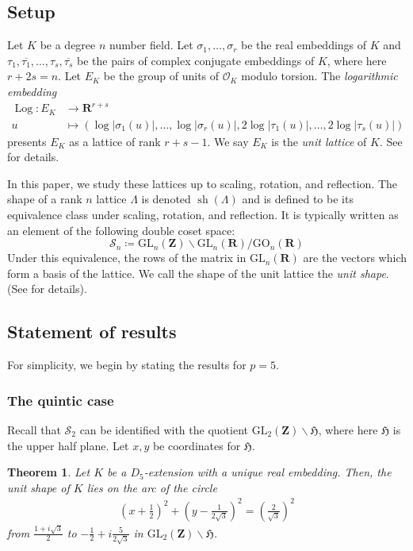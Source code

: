 \documentclass{amsart}
\newcommand{\ZZ}{\mathbf{Z}}
\newcommand{\RR}{\mathbf{R}}
\newcommand{\cO}{\mathcal{O}}
\newcommand{\mf}[1]{\mathfrak{#1}}
\newcommand{\gl}{\mathrm{GL}}
\newcommand{\GO}{\mathrm{GO}}
\DeclareMathOperator{\sh}{sh}
\DeclareMathOperator{\Log}{Log}
\newtheorem{theorem}{Theorem}[section]
\numberwithin{equation}{section}
\begin{document}
\subsection{Setup}
Let $K$ be a degree $n$ number field. Let $\sigma_1,\dots,\sigma_r$ be the real embeddings of $K$ and $\tau_1, \overline{\tau_1},\dots, \tau_s, \overline{\tau_s}$ be the pairs of complex conjugate embeddings of $K$, where here $r + 2s = n$. Let $E_K$ be the group of units of $\cO_K$ modulo torsion. The \emph{logarithmic embedding}
	\begin{align*}
		\Log\colon E_K		&  	\longrightarrow \RR^{r + s}														\\
		 	u		&	\mapsto (\log|\sigma_1(u)|, \hdots, \log|\sigma_r(u)|, 2\log | \tau_1(u) |,\hdots,2\log | \tau_s(u) |)
	\end{align*}
 presents $E_K$ as a lattice of rank $r+s-1$. We say $E_K$ is the \emph{unit lattice} of $K$. See \cite[Chapter~1.7]{neukirch} for details.

In this paper, we study these lattices up to scaling, rotation, and reflection. The shape of a rank $n$ lattice $\Lambda$ is denoted $\sh(\Lambda)$ and is defined to be its equivalence class under scaling, rotation, and reflection. It is typically written as an element of the following double coset space:
	\[	\mathcal{S}_n \coloneqq \gl_n(\ZZ)\backslash \gl_n(\RR) / \GO_n(\RR)		\]
Under this equivalence, the rows of the matrix in $\gl_n(\RR)$ are the vectors which form a basis of the lattice. We call the shape of the unit lattice the \emph{unit shape}. (See \cite[Chapter~2]{milne} for details).

\subsection{Statement of results}\label{results}
For simplicity, we begin by stating the results for $p=5$. 

\subsubsection{The quintic case}
Recall that $\mathcal{S}_2$ can be identified with the quotient $\gl_2(\ZZ)\backslash \mf{H}$, where here $\mf{H}$ is the upper half plane. Let $x,y$ be coordinates for $\mf{H}$.

\begin{theorem}\label{hypercycle}
	Let $K$ be a $D_5$-extension with a unique real embedding. Then, the unit shape of $K$ lies on the arc of the circle
\begin{align*}
	\left(x+\frac{1}{2}\right)^2+\left(y-\frac{1}{2\sqrt{3}}\right)^2=\left(\frac{2}{\sqrt{3}}\right)^2
\end{align*}
from $\frac{1+i\sqrt{3}}{2}$ to $-\frac{1}{2}+i\frac{5}{2\sqrt{3}}$ in $\gl_2(\ZZ)\backslash \mf{H}$.
\end{theorem}
\end{document}
